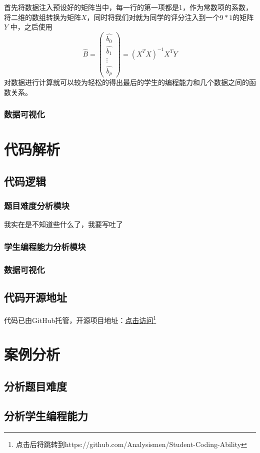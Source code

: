 \documentclass[UTF8]{ctexart}
\begin{document}
首先将数据注入预设好的矩阵当中，每一行的第一项都是1，作为常数项的系数，将二维的数组转换为矩阵$X$，同时将我们对就为同学的评分注入到一个$9*1$的矩阵$Y$
中，之后使用\boldmath$$\hat{B}=\begin{pmatrix}
    \hat{b_0}\\\hat{b_1}\\\vdots\\\hat{b_p}
\end{pmatrix}=(X^TX)^{-1}X^TY$$\unboldmath
对数据进行计算就可以较为轻松的得出最后的学生的编程能力和几个数据之间的函数关系。
\subsubsection{数据可视化}
\section{代码解析}
\subsection{代码逻辑}
\subsubsection{题目难度分析模块}
我实在是不知道些什么了，我要写吐了
\subsubsection{学生编程能力分析模块}
\subsubsection{数据可视化}
\subsection{代码开源地址}
代码已由GitHub托管，开源项目地址：\href{https://github.com/Analysismen/Student-Coding-Ability}{点击访问}\footnote{点击后将跳转到https://github.com/Analysismen/Student-Coding-Ability}
\section{案例分析}
\subsection{分析题目难度}
\subsection{分析学生编程能力}
\end{document}

